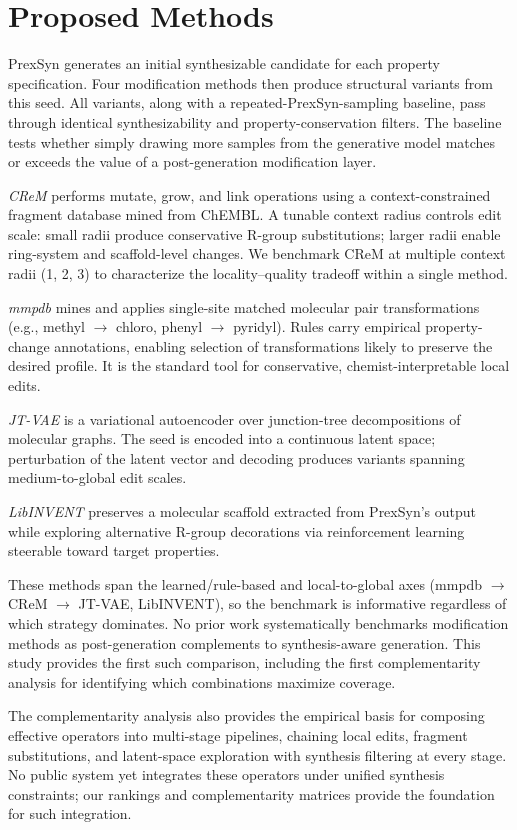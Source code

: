 \section*{Proposed Methods}

PrexSyn generates an initial synthesizable candidate for each property specification. Four modification methods then produce structural variants from this seed. All variants, along with a repeated-PrexSyn-sampling baseline, pass through identical synthesizability and property-conservation filters. The baseline tests whether simply drawing more samples from the generative model matches or exceeds the value of a post-generation modification layer.

\textit{CReM} \cite{bib7} performs mutate, grow, and link operations using a context-constrained fragment database mined from ChEMBL. A tunable context radius controls edit scale: small radii produce conservative R-group substitutions; larger radii enable ring-system and scaffold-level changes. We benchmark CReM at multiple context radii (1, 2, 3) to characterize the locality--quality tradeoff within a single method.

\textit{mmpdb} \cite{bib8} mines and applies single-site matched molecular pair transformations (e.g., methyl $\rightarrow$ chloro, phenyl $\rightarrow$ pyridyl). Rules carry empirical property-change annotations, enabling selection of transformations likely to preserve the desired profile. It is the standard tool for conservative, chemist-interpretable local edits.

\textit{JT-VAE} \cite{bib9} is a variational autoencoder over junction-tree decompositions of molecular graphs. The seed is encoded into a continuous latent space; perturbation of the latent vector and decoding produces variants spanning medium-to-global edit scales.

\textit{LibINVENT} \cite{bib10,bib11} preserves a molecular scaffold extracted from PrexSyn's output while exploring alternative R-group decorations via reinforcement learning steerable toward target properties.

These methods span the learned/rule-based and local-to-global axes (mmpdb $\rightarrow$ CReM $\rightarrow$ JT-VAE, LibINVENT), so the benchmark is informative regardless of which strategy dominates. No prior work systematically benchmarks modification methods as post-generation complements to synthesis-aware generation. This study provides the first such comparison, including the first complementarity analysis for identifying which combinations maximize coverage.

The complementarity analysis also provides the empirical basis for composing effective operators into multi-stage pipelines, chaining local edits, fragment substitutions, and latent-space exploration with synthesis filtering at every stage. No public system yet integrates these operators under unified synthesis constraints; our rankings and complementarity matrices provide the foundation for such integration.
